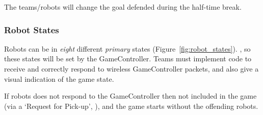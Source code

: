 The teams/robots will change the goal defended during the half-time break.

\subsubsection{Robot States}
\label{sec:robot_states}

Robots can be in \textit{eight} different \emph{primary} states (\cf Figure~\ref{fig:robot_states}). , so these states will be set by the GameController. Teams must implement code to receive and correctly respond to wireless GameController packets, and also give a visual indication of the game state.


If  robots does not respond to the GameController then  not included in the game (via a `Request for Pick-up', ), and the game starts without the offending robots.


